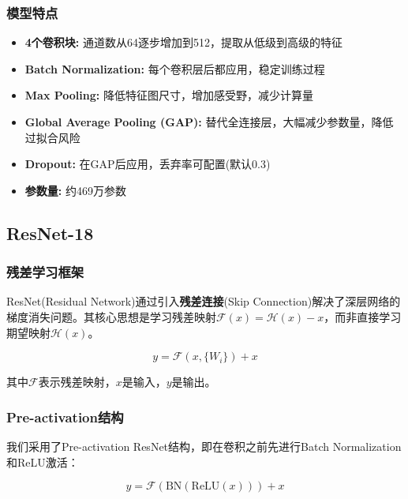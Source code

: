 \documentclass[12pt,a4paper]{article}
\begin{document}
\subsubsection{模型特点}

\begin{itemize}[leftmargin=2em]
    \item \textbf{4个卷积块:} 通道数从64逐步增加到512，提取从低级到高级的特征
    \item \textbf{Batch Normalization:} 每个卷积层后都应用，稳定训练过程
    \item \textbf{Max Pooling:} 降低特征图尺寸，增加感受野，减少计算量
    \item \textbf{Global Average Pooling (GAP):} 替代全连接层，大幅减少参数量，降低过拟合风险
    \item \textbf{Dropout:} 在GAP后应用，丢弃率可配置(默认0.3)
    \item \textbf{参数量:} 约469万参数
\end{itemize}

\subsection{ResNet-18}

\subsubsection{残差学习框架}

ResNet(Residual Network)\cite{he2016deep}通过引入\textbf{残差连接}(Skip Connection)解决了深层网络的梯度消失问题。其核心思想是学习残差映射$\mathcal{F}(x) = \mathcal{H}(x) - x$，而非直接学习期望映射$\mathcal{H}(x)$。

\begin{equation}
    y = \mathcal{F}(x, \{W_i\}) + x
\end{equation}

其中$\mathcal{F}$表示残差映射，$x$是输入，$y$是输出。

\subsubsection{Pre-activation结构}

我们采用了Pre-activation ResNet结构，即在卷积之前先进行Batch Normalization和ReLU激活：

\begin{equation}
    y = \mathcal{F}(\text{BN}(\text{ReLU}(x))) + x
\end{equation}
\end{document}
